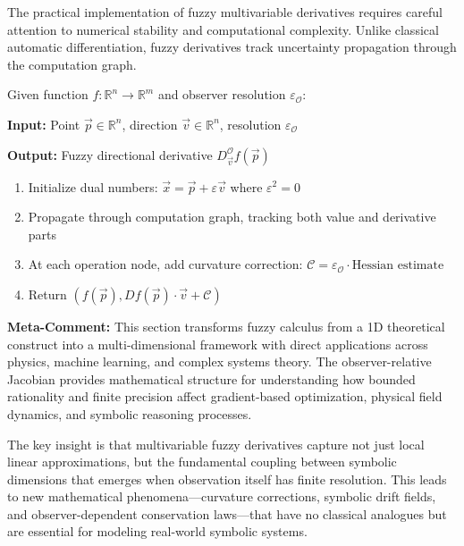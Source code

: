 The practical implementation of fuzzy multivariable derivatives requires careful attention to numerical stability and computational complexity. Unlike classical automatic differentiation, fuzzy derivatives track uncertainty propagation through the computation graph.

\begin{demonstratio}
\label{demonstratio:fuzzy_forward_mode}
Given function $f: \mathbb{R}^n \to \mathbb{R}^m$ and observer resolution $\varepsilon_{\mathcal{O}}$:

\textbf{Input:} Point $\vec{p} \in \mathbb{R}^n$, direction $\vec{v} \in \mathbb{R}^n$, resolution $\varepsilon_{\mathcal{O}}$

\textbf{Output:} Fuzzy directional derivative $D_{\vec{v}}^{\mathcal{O}} f(\vec{p})$

\begin{enumerate}
\item Initialize dual numbers: $\vec{x} = \vec{p} + \varepsilon \vec{v}$ where $\varepsilon^2 = 0$
\item Propagate through computation graph, tracking both value and derivative parts
\item At each operation node, add curvature correction: $\mathcal{C} = \varepsilon_{\mathcal{O}} \cdot \text{Hessian estimate}$
\item Return $(f(\vec{p}), Df(\vec{p}) \cdot \vec{v} + \mathcal{C})$
\end{enumerate}
\end{demonstratio}

\vspace{1em}
\textbf{Meta-Comment:} This section transforms fuzzy calculus from a 1D theoretical construct into a multi-dimensional framework with direct applications across physics, machine learning, and complex systems theory. The observer-relative Jacobian provides mathematical structure for understanding how bounded rationality and finite precision affect gradient-based optimization, physical field dynamics, and symbolic reasoning processes.

The key insight is that multivariable fuzzy derivatives capture not just local linear approximations, but the fundamental coupling between symbolic dimensions that emerges when observation itself has finite resolution. This leads to new mathematical phenomena—curvature corrections, symbolic drift fields, and observer-dependent conservation laws—that have no classical analogues but are essential for modeling real-world symbolic systems.

